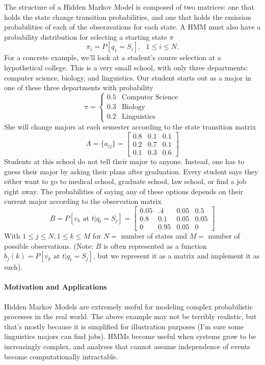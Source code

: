 The structure of a Hidden Markov Model is composed of two matrices: one that holds the state change transition probabilities, and one that holds the emission probabilities of each of the obseravations for each state. A HMM must also have a probability distribution for selecting a starting state $\pi$ \[
  \pi_i = P[q_1 = S_i], \ \ \ 1 \leq i \leq N.
\] For a concrete example, we'll look at a student's course selection at a hypothetical college. This is a very small school, with only three departments: computer science, biology, and linguistics. Our student starts out as a major in one of these three departments with probability \[
  \pi = \begin{cases}
            0.5 & \text{Computer Science}\\
            0.3 & \text{Biology}\\
            0.2 & \text{Linguistics}
          \end{cases}
\] She will change majors at each semester according to the state transition matrix \[
  A = \{a_{ij}\} = \begin{bmatrix}
                      0.8 & 0.1 & 0.1\\
                      0.2 & 0.7 & 0.1\\
                      0.1 & 0.3 & 0.6
                    \end{bmatrix}
\] Students at this school do not tell their major to anyone. Instead, one has to guess their major by asking their plans after graduation. Every student says they either want to go to medical school, graduate school, law school, or find a job right away. The probabilities of saying any of these options depends on their current major according to the observation matrix \[
  B = P[v_k \text{ at } t|q_t = S_j] = \begin{bmatrix}
                                        0.05 & .4 & 0.05 & 0.5\\
                                        0.8 & 0.1 & 0.05 & 0.05\\
                                        0 & 0.95 & 0.05 & 0
                                      \end{bmatrix}
\] With $1 \leq j \leq N, 1 \leq k \leq M$ for $N =$ number of states and $M =$ number of possible observations. (Note: $B$ is often represented as a function $b_j(k) = P[v_k \text{ at } t|q_t = S_j]$, but we represent it as a matrix and implement it as such).



\paragraph{Motivation and Applications}
Hidden Markov Models are extremely useful for modeling complex probabilistic processes in the real world. The above example may not be terribly realistic, but that's mostly because it is simplified for illustration purposes (I'm sure some linguistics majors can find jobs). HMMs become useful when systems grow to be increasingly complex, and analyses that cannot assume independence of events become computationally intractable.

